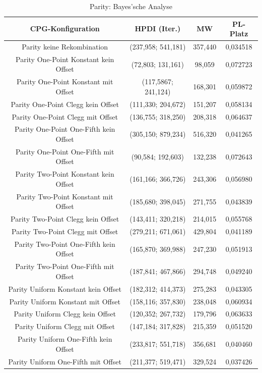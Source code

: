 \begin{table}[H]
	\centering
	\begin{tabular}{c | c | c | c}
		\textbf{CPG-Konfiguration} & \textbf{HPDI (Iter.)} & \textbf{MW} & \textbf{PL-Platz}\\
		\hline
		Parity keine Rekombination & (237,958; 541,181) & 357,440 & 0,034518\\
		\hline
		Parity One-Point Konstant kein Offset & (72,803; 131,161) & 98,059 & 0,072723\\
		\hline
		Parity One-Point Konstant mit Offset & (117,5867; 241,124) & 168,301 & 0,059872\\
		\hline
		Parity One-Point Clegg kein Offset & (111,330; 204,672) & 151,207 & 0,058134\\
		\hline
		Parity One-Point Clegg mit Offset & (136,755; 318,250) & 208,318 & 0,064637\\
		\hline
		Parity One-Point One-Fifth kein Offset & (305,150; 879,234) & 516,320 & 0,041265\\
		\hline
		Parity One-Point One-Fifth mit Offset & (90,584; 192,603) & 132,238 & 0,072643\\
		\hline
		Parity Two-Point Konstant kein Offset & (161,166; 366,726) & 243,306 & 0,056980\\
		\hline
		Parity Two-Point Konstant mit Offset & (185,680; 398,045) & 271,755 & 0,043839\\
		\hline
		Parity Two-Point Clegg kein Offset & (143,411; 320,218) & 214,015 & 0,055768\\
		\hline
		Parity Two-Point Clegg mit Offset & (279,211; 671,061) & 429,804 & 0,041189\\
		\hline
		Parity Two-Point One-Fifth kein Offset & (165,870; 369,988) & 247,230 & 0,051913\\
		\hline
		Parity Two-Point One-Fifth mit Offset & (187,841; 467,866) & 294,748 & 0,049240\\
		\hline
		Parity Uniform Konstant kein Offset & (182,312; 414,373) & 275,283 & 0,043305\\
		\hline
		Parity Uniform Konstant mit Offset & (158,116; 357,830) & 238,048 & 0,060934\\
		\hline
		Parity Uniform Clegg kein Offset & (120,352; 267,732) & 179,796 & 0,063633\\
		\hline
		Parity Uniform Clegg mit Offset & (147,184; 317,828) & 215,359 & 0,051520\\
		\hline
		Parity Uniform One-Fifth kein Offset & (233,817; 551,718) & 356,681 & 0,040460\\
		\hline
		Parity Uniform One-Fifth mit Offset & (211,377; 519,471) & 329,524 & 0,037426\\
	\end{tabular}
	\label{table:parityBayesian}
	\caption{Parity: Bayes'sche Analyse}
\end{table}

